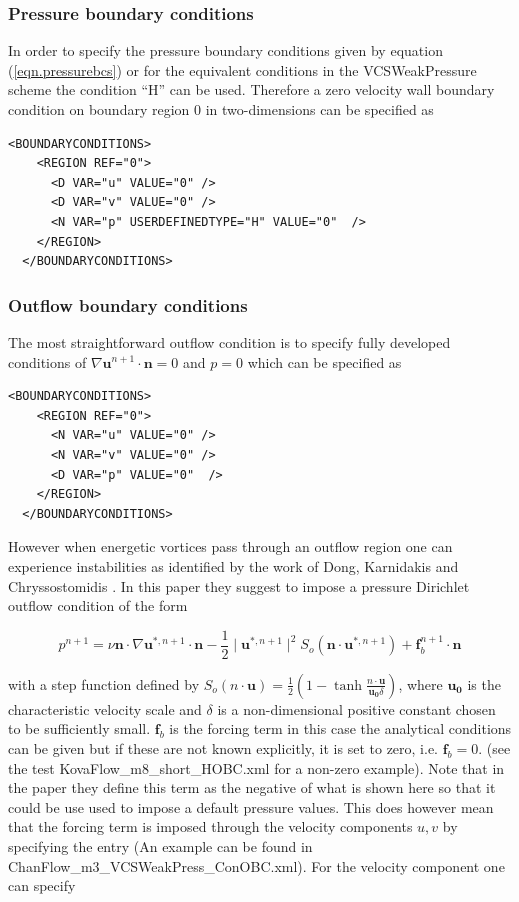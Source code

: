 \subsubsection{Pressure boundary conditions}

In order to specify the pressure boundary conditions given by equation
(\ref{eqn.pressurebcs}) or for the equivalent conditions in the VCSWeakPressure
scheme the  condition ``H'' can be
used. Therefore a zero velocity wall boundary condition on boundary
region 0 in two-dimensions can be specified as

\begin{lstlisting}[style=XMLStyle]
  <BOUNDARYCONDITIONS>
    <REGION REF="0">
      <D VAR="u" VALUE="0" />
      <D VAR="v" VALUE="0" />
      <N VAR="p" USERDEFINEDTYPE="H" VALUE="0"  />
    </REGION>
  </BOUNDARYCONDITIONS>
\end{lstlisting}


\subsubsection{Outflow boundary conditions}

The most straightforward outflow condition is to specify fully
developed conditions of $\nabla\mathbf{u}^{n+1}\cdot \mathbf{n}=0$ and
$p=0$ which can be specified as 

\begin{lstlisting}[style=XMLStyle]
  <BOUNDARYCONDITIONS>
    <REGION REF="0">
      <N VAR="u" VALUE="0" />
      <N VAR="v" VALUE="0" />
      <D VAR="p" VALUE="0"  />
    </REGION>
  </BOUNDARYCONDITIONS>
\end{lstlisting}

However when energetic vortices pass through an outflow region one can
experience instabilities as identified by the work of Dong, Karnidakis
and Chryssostomidis \cite{DoKa14}. In this paper they suggest to
impose a pressure Dirichlet outflow condition of the form

\begin{equation}
 p^{n+1}= \nu \mathbf{n} \cdot \nabla\mathbf{u}^{*,n+1}\cdot \mathbf{n}-\frac{1}{2}
 \mid \mathbf{u}^{*,n+1} \mid^2 S_o(\mathbf{n}\cdot
 \mathbf{u}^{*,n+1})+\mathbf{f}_b^{n+1}\cdot \mathbf{n}
\end{equation}

with a step function defined by $S_o(n\cdot
\mathbf{u})=\frac{1}{2}(1-\tanh\frac{n\cdot\mathbf{u}}{\mathbf{u_0}\delta})$,
where $\mathbf{u_0}$ is the characteristic velocity scale and $\delta$
is a non-dimensional positive constant chosen to be sufficiently
small. $\mathbf{f}_b$ is the forcing term in this case the analytical
conditions can be given but if these are not known explicitly, it is
set to zero, i.e. $\mathbf{f}_b=0$. (see the test
KovaFlow\_m8\_short\_HOBC.xml for a non-zero example). Note that in
the paper \cite{DoKa14} they define this term as the negative of what
is shown here so that it could be use used to impose a default
pressure values. This does however mean that the forcing term is
imposed through the velocity components $u,v$ by specifying the entry
 (An example can be found in
ChanFlow\_m3\_VCSWeakPress\_ConOBC.xml). For the velocity component
one can specify

